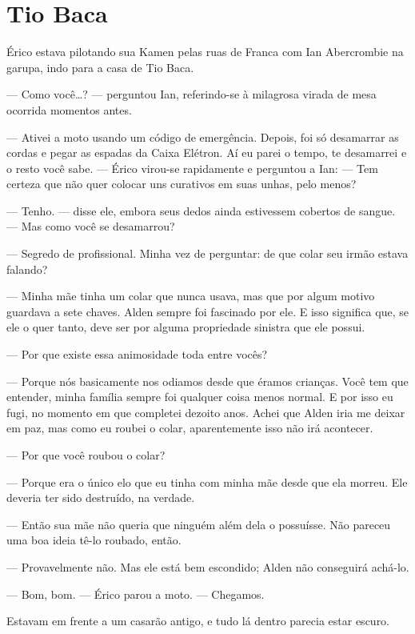 \chapter{Tio Baca}


Érico estava pilotando sua Kamen pelas ruas de Franca com Ian Abercrombie na
garupa, indo para a casa de Tio Baca.

--- Como você\ldots? --- perguntou Ian, referindo-se à milagrosa virada de mesa
ocorrida momentos antes.

--- Ativei a moto usando um código de emergência. Depois, foi só desamarrar as
cordas e pegar as espadas da Caixa Elétron. Aí eu parei o tempo, te desamarrei
e o resto você sabe. --- Érico virou-se rapidamente e perguntou a Ian: --- Tem
certeza que não quer colocar uns curativos em suas unhas, pelo menos?

--- Tenho. --- disse ele, embora seus dedos ainda estivessem cobertos de
sangue. --- Mas como você se desamarrou?

--- Segredo de profissional. Minha vez de perguntar: de que colar seu irmão
estava falando?

--- Minha mãe tinha um colar que nunca usava, mas que por algum motivo guardava
a sete chaves. Alden sempre foi fascinado por ele. E isso significa que, se ele
o quer tanto, deve ser por alguma propriedade sinistra que ele possui.

--- Por que existe essa animosidade toda entre vocês?

--- Porque nós basicamente nos odiamos desde que éramos crianças. Você tem que
entender, minha família sempre foi qualquer coisa menos normal. E por isso eu
fugi, no momento em que completei dezoito anos. Achei que Alden iria me deixar
em paz, mas como eu roubei o colar, aparentemente isso não irá acontecer.

--- Por que você roubou o colar?

--- Porque era o único elo que eu tinha com minha mãe desde que ela morreu. Ele
deveria ter sido destruído, na verdade.

--- Então sua mãe não queria que ninguém além dela o possuísse. Não pareceu uma
boa ideia tê-lo roubado, então.

--- Provavelmente não. Mas ele está bem escondido; Alden não conseguirá
achá-lo.

--- Bom, bom. --- Érico parou a moto. --- Chegamos.

Estavam em frente a um casarão antigo, e tudo lá dentro parecia estar escuro.

